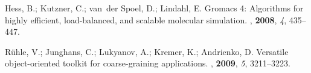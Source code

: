 \documentclass[aps,prb,preprint,citeautoscript]{revtex4}
\begin{document}
\begin{thebibliography}{10}
Hess, B.; Kutzner, C.; van~der Spoel, D.; Lindahl, E.
\newblock Gromacs 4: Algorithms for highly efficient, load-balanced, and
  scalable molecular simulation.
, \textbf{2008}, \textit{4}, 435--447.

R\"uhle, V.; Junghans, C.; Lukyanov, A.; Kremer, K.; Andrienko, D.
\newblock Versatile object-oriented toolkit for coarse-graining applications.
, \textbf{2009}, \textit{5}, 3211--3223.

\end{thebibliography}
\end{document}
